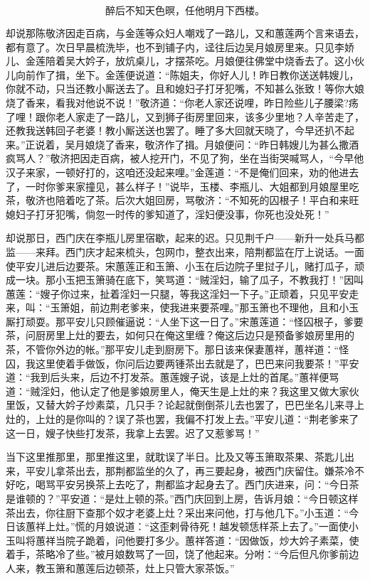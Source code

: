 \[
醉后不知天色暝，任他明月下西楼。
\]

却说那陈敬济因走百病，与金莲等众妇人嘲戏了一路儿，又和蕙莲两个言来语去，都有意了。次日早晨梳洗毕，也不到铺子内，迳往后边吴月娘房里来。只见李娇儿、金莲陪着吴大妗子，放炕桌儿，才摆茶吃。月娘便往佛堂中烧香去了。这小伙儿向前作了揖，坐下。金莲便说道：“陈姐夫，你好人儿！昨日教你送送韩嫂儿，你就不动，只当还教小厮送去了。且和媳妇子打牙犯嘴，不知甚么张致！等你大娘烧了香来，看我对他说不说！”敬济道：“你老人家还说哩，昨日险些儿子腰梁?疡了哩！跟你老人家走了一路儿，又到狮子街房里回来，该多少里地？人辛苦走了，还教我送韩回子老婆！教小厮送送也罢了。睡了多大回就天晓了，今早还扒不起来。”正说着，吴月娘烧了香来，敬济作了揖。月娘便问：“昨日韩嫂儿为甚么撒酒疯骂人？”敬济把因走百病，被人挖开门，不见了狗，坐在当街哭喊骂人，“今早他汉子来家，一顿好打的，这咱还没起来哩。”金莲道：“不是俺们回来，劝的他进去了，一时你爹来家撞见，甚么样子！”说毕，玉楼、李瓶儿、大姐都到月娘屋里吃茶，敬济也陪着吃了茶。后次大姐回房，骂敬济：“不知死的囚根子！平白和来旺媳妇子打牙犯嘴，倘忽一时传的爹知道了，淫妇便没事，你死也没处死！”

却说那日，西门庆在李瓶儿房里宿歇，起来的迟。只见荆千户——新升一处兵马都监——来拜。西门庆才起来梳头，包网巾，整衣出来，陪荆都监在厅上说话。一面使平安儿进后边要茶。宋蕙莲正和玉箫、小玉在后边院子里挝子儿，赌打瓜子，顽成一块。那小玉把玉箫骑在底下，笑骂道：“贼淫妇，输了瓜子，不教我打！”因叫蕙莲：“嫂子你过来，扯着淫妇一只腿，等我这淫妇一下子。”正顽着，只见平安走来，叫：“玉箫姐，前边荆老爹来，使我进来要茶哩。”那玉箫也不理他，且和小玉厮打顽耍。那平安儿只顾催逼说：“人坐下这一日了。”宋蕙莲道：“怪囚根子，爹要茶，问厨房里上灶的要去，如何只在俺这里缠？俺这后边只是预备爹娘房里用的茶，不管你外边的帐。”那平安儿走到厨房下。那日该来保妻蕙祥，蕙祥道：“怪囚，我这里使着手做饭，你问后边要两锺茶出去就是了，巴巴来问我要茶！”平安道：“我到后头来，后边不打发茶。蕙莲嫂子说，该是上灶的首尾。”蕙祥便骂道：“贼淫妇，他认定了他是爹娘房里人，俺天生是上灶的来？我这里又做大家伙里饭，又替大妗子炒素菜，几只手？论起就倒倒茶儿去也罢了，巴巴坐名儿来寻上灶的，上灶的是你叫的？误了茶也罢，我偏不打发上去。”平安儿道：“荆老爹来了这一日，嫂子快些打发茶，我拿上去罢。迟了又惹爹骂！”

当下这里推那里，那里推这里，就耽误了半日。比及又等玉箫取茶果、茶匙儿出来，平安儿拿茶出去，那荆都监坐的久了，再三要起身，被西门庆留住。嫌茶冷不好吃，喝骂平安另换茶上去吃了，荆都监才起身去了。西门庆进来，问：“今日茶是谁顿的？”平安道：“是灶上顿的茶。”西门庆回到上房，告诉月娘：“今日顿这样茶出去，你往厨下查那个奴才老婆上灶？采出来问他，打与他几下。”小玉道：“今日该蕙祥上灶。”慌的月娘说道：“这歪剌骨待死！越发顿恁样茶上去了。”一面使小玉叫将蕙祥当院子跪着，问他要打多少。蕙祥答道：“因做饭，炒大妗子素菜，使着手，茶略冷了些。”被月娘数骂了一回，饶了他起来。分咐：“今后但凡你爹前边人来，教玉箫和蕙莲后边顿茶，灶上只管大家茶饭。”

